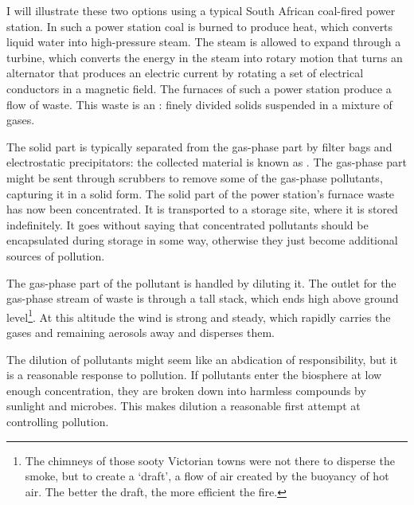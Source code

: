 
I will illu\-strate these two options using a typical South Afri\-can coal-fired
pow\-er sta\-tion. In such a power station coal is burned to produce heat, which
converts liquid water into high-pressure steam. The steam is allowed to expand
through a turbine, which converts the energy in the steam into rotary motion
that turns an alternator that produces an electric current by rotating a set of
electrical conductors in a magnetic field. The furnaces of such a power station
produce a flow of waste. This waste is an :
finely divided solids suspended in a mixture of gases.

The solid part is typically separated from the gas-phase part by filter bags and
electrostatic precipitators: the collected material is known as . The gas-phase part might be sent through scrubbers to remove some of the
gas-phase pollutants, capturing it in a solid form. The solid part of the power
station's furnace waste has now been concentrated. It is transported to a
storage site, where it is stored indefinitely. It goes without saying that
concentrated pollutants should be encapsulated during storage in some way,
otherwise they just become additional sources of pollution.

The gas-phase part of the pollutant is handled by diluting it. The outlet for
the gas-phase stream of waste is through a tall stack, which ends high above
ground level\footnote{The chimneys of those sooty Victorian towns were not there
to disperse the smoke, but to create a `draft', a flow of air created by the
buoyancy of hot air. The better the draft, the more efficient the fire.}. At
this altitude the wind is strong and steady, which rapidly carries the gases and
remaining aerosols away and disperses them.

The dilution of pollutants might seem like an abdication of responsibility, but
it is a reasonable response to pollution. If pollutants enter the biosphere at
low enough concentration, they are broken down into harmless compounds by
sunlight and microbes. This makes dilution a reasonable first attempt at
controlling pollution.

